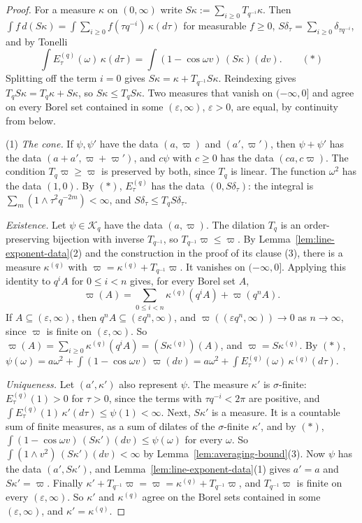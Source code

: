 \begin{proof}
For a measure $\kappa$ on $(0,\infty)$ write $S\kappa := \sum_{i \ge 0}T_{q^{-i}}\kappa$. Then
$\int f\,d(S\kappa) = \int\sum_{i \ge 0}f(\tau q^{-i})\,\kappa(d\tau)$ for measurable $f \ge 0$,
$S\delta_\tau = \sum_{i \ge 0}\delta_{\tau q^{-i}}$, and by Tonelli
\[
  \int E^{(q)}_\tau(\omega)\,\kappa(d\tau) = \int(1 - \cos\omega v)\,(S\kappa)(dv). \qquad (*)
\]
Splitting off the term $i = 0$ gives $S\kappa = \kappa + T_{q^{-1}}S\kappa$. Reindexing gives
$T_qS\kappa = T_q\kappa + S\kappa$, so $S\kappa \le T_qS\kappa$. Two measures that vanish on
$(-\infty,0]$ and agree on every Borel set contained in some $(\varepsilon,\infty)$,
$\varepsilon > 0$, are equal, by continuity from below.

(1) \emph{The cone.} If $\psi, \psi'$ have the data $(a,\varpi)$ and $(a',\varpi')$, then
$\psi + \psi'$ has the data $(a + a', \varpi + \varpi')$, and $c\psi$ with $c \ge 0$ has the data
$(ca, c\varpi)$. The condition $T_q\varpi \ge \varpi$ is preserved by both, since $T_q$ is linear.
The function $\omega^2$ has the data $(1, 0)$. By $(*)$, $E^{(q)}_\tau$ has the data
$(0, S\delta_\tau)$: the \Levy{} integral is $\sum_m(1 \wedge \tau^2q^{-2m}) < \infty$, and
$S\delta_\tau \le T_qS\delta_\tau$.

\emph{Existence.} Let $\psi \in \mathcal{K}_q$ have the data $(a, \varpi)$. The dilation $T_q$ is an
order-preserving bijection with inverse $T_{q^{-1}}$, so $T_{q^{-1}}\varpi \le \varpi$. By
Lemma~\ref{lem:line-exponent-data}(2) and the construction in the proof of its clause (3), there is
a measure $\kappa^{(q)}$ with $\varpi = \kappa^{(q)} + T_{q^{-1}}\varpi$. It vanishes on
$(-\infty,0]$. Applying this identity to $q^iA$ for $0 \le i < n$ gives, for every Borel set $A$,
\[
  \varpi(A) = \sum_{0 \le i < n}\kappa^{(q)}(q^iA) + \varpi(q^nA).
\]
If $A \subseteq (\varepsilon,\infty)$, then $q^nA \subseteq (\varepsilon q^n,\infty)$, and
$\varpi((\varepsilon q^n,\infty)) \to 0$ as $n \to \infty$, since $\varpi$ is finite on
$(\varepsilon,\infty)$. So $\varpi(A) = \sum_{i \ge 0}\kappa^{(q)}(q^iA) = (S\kappa^{(q)})(A)$, and
$\varpi = S\kappa^{(q)}$. By $(*)$,
$\psi(\omega) = a\omega^2 + \int(1 - \cos\omega v)\,\varpi(dv)
= a\omega^2 + \int E^{(q)}_\tau(\omega)\,\kappa^{(q)}(d\tau)$.

\emph{Uniqueness.} Let $(a', \kappa')$ also represent $\psi$. The measure $\kappa'$ is
$\sigma$-finite: $E^{(q)}_\tau(1) > 0$ for $\tau > 0$, since the terms with $\tau q^{-i} < 2\pi$ are
positive, and $\int E^{(q)}_\tau(1)\,\kappa'(d\tau) \le \psi(1) < \infty$. Next, $S\kappa'$ is a
\Levy{} measure. It is a countable sum of finite measures, as a sum of dilates of the
$\sigma$-finite $\kappa'$, and by $(*)$, $\int(1 - \cos\omega v)\,(S\kappa')(dv) \le \psi(\omega)$
for every $\omega$. So $\int(1 \wedge v^2)\,(S\kappa')(dv) < \infty$ by
Lemma~\ref{lem:averaging-bound}(3). Now $\psi$ has the data $(a', S\kappa')$,
and Lemma~\ref{lem:line-exponent-data}(1) gives $a' = a$ and $S\kappa' = \varpi$. Finally
$\kappa' + T_{q^{-1}}\varpi = \varpi = \kappa^{(q)} + T_{q^{-1}}\varpi$, and $T_{q^{-1}}\varpi$ is
finite on every $(\varepsilon,\infty)$. So $\kappa'$ and $\kappa^{(q)}$ agree on the Borel sets
contained in some $(\varepsilon,\infty)$, and $\kappa' = \kappa^{(q)}$.


\end{proof}
